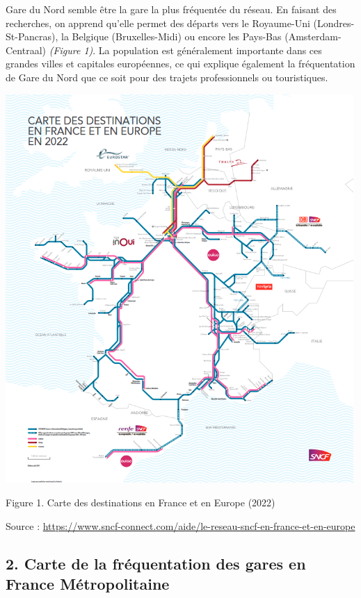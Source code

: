 \documentclass[
]{article}
\begin{document}
Gare du Nord semble être la gare la plus fréquentée du réseau. En
faisant des recherches, on apprend qu'elle permet des départs vers le
Royaume-Uni (Londres-St-Pancras), la Belgique (Bruxelles-Midi) ou encore
les Pays-Bas (Amsterdam-Centraal) \emph{(Figure 1)}. La population est
généralement importante dans ces grandes villes et capitales
européennes, ce qui explique également la fréquentation de Gare du Nord
que ce soit pour des trajets professionnels ou touristiques.

\includegraphics[width=5.20833in,height=\textheight]{images/carte-reseau-sncf.png}

Figure 1. Carte des destinations en France et en Europe (2022)

Source :
\url{https://www.sncf-connect.com/aide/le-reseau-sncf-en-france-et-en-europe}

\hypertarget{carte-de-la-fruxe9quentation-des-gares-en-france-muxe9tropolitaine}{%
\subsection{2. Carte de la fréquentation des gares en France
Métropolitaine}\label{carte-de-la-fruxe9quentation-des-gares-en-france-muxe9tropolitaine}}
\end{document}
